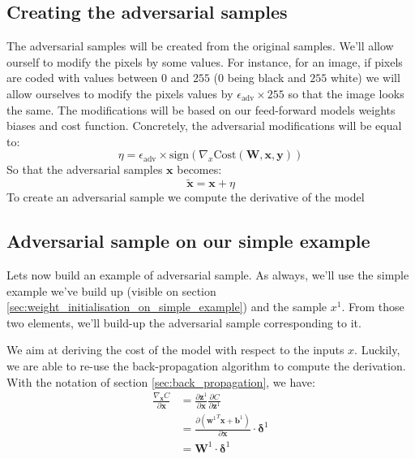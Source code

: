 		

	\subsection{Creating the adversarial samples}
	\label{sec:creating_the_adversarial_samples}
		The adversarial samples will be created from the original samples. We'll allow ourself to modify the pixels by some values. For instance, for an image, if pixels are coded with values between $0$ and $255$ ($0$ being black and $255$ white) we will allow ourselves to modify the pixels values by $\epsilon_{\text{adv}} \times 255$ so that the image looks the same. The modifications will be based on our feed-forward models weights biases and cost function. Concretely, the adversarial modifications will be equal to:
		$$ \eta = \epsilon_{\text{adv}} \times \text{sign}(\nabla_x \text{Cost}(\boldsymbol{W},\boldsymbol{x},\boldsymbol{y})) $$
		So that the adversarial samples $\boldsymbol{x}$ becomes:
		$$ \tilde{\boldsymbol{x}} = \boldsymbol{x} + \eta $$
		To create an adversarial sample we compute the derivative of the model 


	\subsection{Adversarial sample on our simple example}
	\label{sub:adversarial_sample_on_the_simple_example}
		Lets now build an example of adversarial sample. As always, we'll use the simple example we've build up (visible on section \ref{sec:weight_initialisation_on_simple_example}) and the sample $x^1$. From those two elements, we'll build-up the adversarial sample corresponding to it.

		We aim at deriving the cost of the model with respect to the inputs $x$. Luckily, we are able to re-use the back-propagation algorithm to compute the derivation. With the notation of section \ref{sec:back_propagation}, we have:
		\begin{equation}
			\begin{split}
				\frac{\nabla_{\boldsymbol{x}} C}{\partial \boldsymbol{x} } 
				&= \frac{\partial \boldsymbol{z}^1}{\partial \boldsymbol{x}} \frac{\partial C}{\partial \boldsymbol{z}^1 } \\
				&= \frac{\partial \left({\boldsymbol{w}^1}^T \boldsymbol{x} + \boldsymbol{b}^1 \right)}{\partial \boldsymbol{x}} \cdot \boldsymbol{\delta}^1 \\
				&= \boldsymbol{W}^1 \cdot \boldsymbol{\delta}^1
			\end{split}
		\end{equation}

